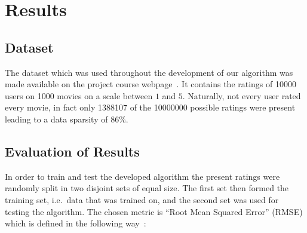 \documentclass[10pt,conference,compsocconf]{IEEEtran}
\begin{document}


\section{Results}
\label{sec:results}



\subsection{Dataset}
\label{sub:dataset}

The dataset which was used throughout the development of our algorithm was made
available on the project course webpage~\cite{lab2015collaborative}. It contains
the ratings of \num{10000} users on \num{1000} movies on a scale between $1$ and
$5$. Naturally, not every user rated every movie, in fact only \num{1388107} of
the \num{10000000} possible ratings were present leading to a data sparsity of
$86\%$.

\subsection{Evaluation of Results}
\label{sub:evaluation_of_results}

In order to train and test the developed algorithm the present ratings were
randomly split in two disjoint sets of equal size. The first set then formed
the training set, i.e.\ data that was trained on, and the second set was used
for testing the algorithm. The chosen metric is ``Root Mean Squared Error''
(RMSE) which is defined in the following way~\cite{koren2008factorization,
  koren2010factor, koren2011advances}:
\end{document}
